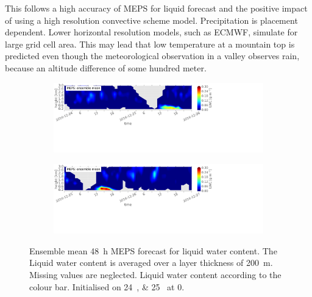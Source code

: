 This follows a high accuracy of MEPS for liquid forecast and the positive impact of using a high resolution convective scheme model. Precipitation is placement dependent. Lower horizontal resolution models, such as ECMWF, simulate for large grid cell area. This may lead that low temperature at a mountain top is predicted even though the meteorological observation in a valley observes rain, because an altitude difference of some hundred meter. %
\begin{figure}[t]
	\centering
	\begin{subfigure}[b]{\textwidth}
		\centering
		\includegraphics[trim={0.cm 11.5cm 18.5cm 0.4cm},clip,width=\textwidth]{./fig_vert_LWC_EM/20161224}
		\caption{}\label{fig:LWC:24}
	\end{subfigure}
	\begin{subfigure}[b]{\textwidth}
		\centering
		\includegraphics[trim={0.cm 10cm 18.5cm 0.4cm},clip,width=\textwidth]{./fig_vert_LWC_EM/20161225}
		\caption{}\label{fig:LWC:25}
	\end{subfigure}
	\caption{Ensemble mean \SI{48}{\hour} MEPS forecast for liquid water content. The Liquid water content is averaged over a layer thickness of \SI{200}{\metre}.  Missing values are neglected. Liquid water content according to the colour bar.
		Initialised on \SIlist{24;25}{\dec} at \SI{0}{\UTC}. 
	}\label{fig:LWC:2425}
\end{figure}
